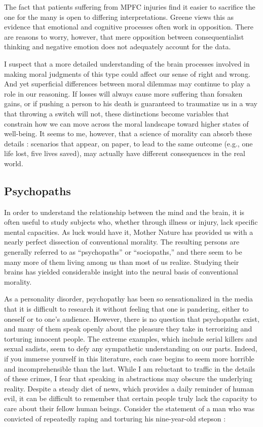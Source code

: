\documentclass[a4paper,14pt]{extbook}
\begin{document}
The fact that patients suffering from MPFC injuries find it easier to sacrifice the one for the many is open to differing interpretations.
Greene views this as evidence that emotional and cognitive processes often work in opposition.
There are reasons to worry, however, that mere opposition between consequentialist thinking and negative emotion does not adequately account for the data.

I suspect that a more detailed understanding of the brain processes involved in making moral judgments of this type could affect our sense of right and wrong.
And yet superficial differences between moral dilemmas may continue to play a role in our reasoning.
If losses will always cause more suffering than forsaken gains, or if pushing a person to his death is guaranteed to traumatize us in a way that throwing a switch will not, these distinctions become variables that constrain how we can move across the moral landscape toward higher states of well-being.
It seems to me, however, that a science of morality can absorb these details :
scenarios that appear, on paper, to lead to the same outcome (e.g., one life lost, five lives saved), may actually have different consequences in the real world.

\subsection{Psychopaths}

In order to understand the relationship between the mind and the brain, it is often useful to study subjects who, whether through illness or injury, lack specific mental capacities.
As luck would have it, Mother Nature has provided us with a nearly perfect dissection of conventional morality.
The resulting persons are generally referred to as ``psychopaths'' or ``sociopaths,'' and there seem to be many more of them living among us than most of us realize.
Studying their brains has yielded considerable insight into the neural basis of conventional morality.

As a personality disorder, psychopathy has been so sensationalized in the media that it is difficult to research it without feeling that one is pandering, either to oneself or to one’s audience.
However, there is no question that psychopaths exist, and many of them speak openly about the pleasure they take in terrorizing and torturing innocent people.
The extreme examples, which include serial killers and sexual sadists, seem to defy any sympathetic understanding on our parts.
Indeed, if you immerse yourself in this literature, each case begins to seem more horrible and incomprehensible than the last.
While I am reluctant to traffic in the details of these crimes, I fear that speaking in abstractions may obscure the underlying reality.
Despite a steady diet of news, which provides a daily reminder of human evil, it can be difficult to remember that certain people truly lack the capacity to care about their fellow human beings.
Consider the statement of a man who was convicted of repeatedly raping and torturing his nine-year-old stepson :
\end{document}
